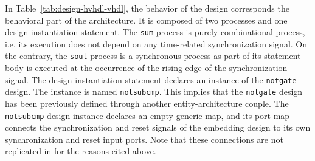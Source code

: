 \documentclass[pdflatex,sn-mathphys]{sn-jnl}%
\theoremstyle{thmstyleone}%
\theoremstyle{thmstyletwo}%
\theoremstyle{thmstylethree}%
\begin{document}
In Table~\ref{tab:design-hvhdl-vhdl}, the behavior of the design
corresponds the behavioral part of the architecture. It is composed of
two processes and one design instantiation statement. The \texttt{sum}
process is purely combinational process, i.e. its execution does not
depend on any time-related synchronization signal. On the contrary,
the \texttt{sout} process is a synchronous process as part of its
statement body is executed at the occurrence of the rising edge of the
synchronization signal. The design instantiation statement declares an
instance of the \texttt{notgate} design. The instance is named
\texttt{notsubcmp}. This implies that the \texttt{notgate} design has
been previously defined through another entity-architecture
couple. The \texttt{notsubcmp} design instance declares an empty
generic map, and its port map connects the synchronization and reset
signals of the embedding design to its own synchronization and reset
input ports. Note that these connections are not replicated in
\hvhdl{} for the reasons cited above.
\end{document}
